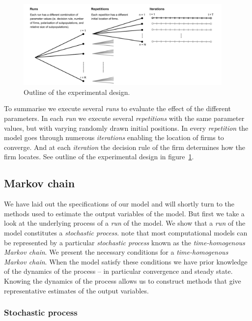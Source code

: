 \documentclass[preprint, 12pt]{elsarticle}
\begin{document}
\begin{figure}[ht!]
	\centering
	\includegraphics[width=0.95\textwidth, trim={10mm 0 10mm 0}]{Graphics/ExperimentalDesign.pdf}
	\caption{Outline of the experimental design.}
	\label{fig:experimental}
\end{figure}

To summarise we execute several \emph{runs} to evaluate the effect of the different parameters. In each \emph{run} we execute several \emph{repetitions} with the same parameter values, but with varying randomly drawn initial positions. In every \emph{repetition} the model goes through numerous \emph{iterations} enabling the location of firms to converge. And at each \emph{iteration} the decision rule of the firm determines how the firm locates. See outline of the experimental design in figure~\ref{fig:experimental}.

\subsection{Markov chain}

We have laid out the specifications of our model and will shortly turn to the methods used to estimate the output variables of the model. But first we take a look at the underlying process of a \emph{run} of the model. We show that a \emph{run} of the model constitutes a \emph{stochastic process}. \citet{Laver_Sergenti_2011} note that most computational models can be represented by a particular \emph{stochastic process} known as the \emph{time-homogenous Markov chain}. We present the necessary conditions for a \emph{time-homogenous Markov chain}. When the model satisfy these conditions we have prior knowledge of the dynamics of the process -- in particular convergence and steady state. Knowing the dynamics of the process allows us to construct methods that give representative estimates of the output variables.

\subsubsection{Stochastic process}
\end{document}
